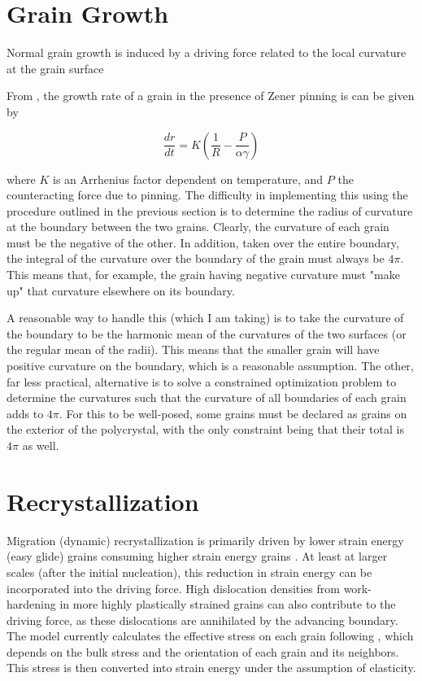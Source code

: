 \documentclass{article}
\begin{document}
\section{Grain Growth}
Normal grain growth is induced by a driving force related to the local curvature at the grain surface

From \citet{durand2006}, the growth rate of a grain in the presence of Zener pinning is can be given by

\[\frac{dr}{dt} = K \left( \frac{1}{R}-\frac{P}{\alpha \gamma} \right)
\]

where $K$ is an Arrhenius factor dependent on temperature, and $P$ the counteracting force due to pinning. The difficulty in implementing this using the procedure outlined in the previous section is to determine the radius of curvature at the boundary between the two grains. Clearly, the curvature of each grain must be the negative of the other. In addition, taken over the entire boundary, the integral of the curvature over the boundary of the grain must always be $4 \pi$. This means that, for example, the grain having negative curvature must "make up" that curvature elsewhere on its boundary. 

A reasonable way to handle this (which I am taking)  is to take the curvature of the boundary to be the harmonic mean of the curvatures of the two surfaces (or the regular mean of the radii). This means that the smaller grain will have positive curvature on the boundary, which is a reasonable assumption. The other, far less practical, alternative is to solve a constrained optimization problem to determine the curvatures such that the curvature of all boundaries of each grain adds to $4 \pi$. For this to be well-posed, some grains must be declared as grains on the exterior of the polycrystal, with the only constraint being that their total is $4 \pi$ as well. 




\section{Recrystallization}
Migration (dynamic) recrystallization is primarily driven by lower strain energy (easy glide) grains consuming higher strain energy grains \citep{duval1995}. At least at larger scales (after the initial nucleation), this reduction in strain energy can be incorporated into the driving force. High dislocation densities from work-hardening in more highly plastically strained grains can also contribute to the driving force, as these dislocations are annihilated by the advancing boundary. The model currently calculates the effective stress on each grain following \citet{azuma96}, which depends on the bulk stress and the orientation of each grain and its neighbors. This stress is then converted into strain energy under the assumption of elasticity.
\end{document}
